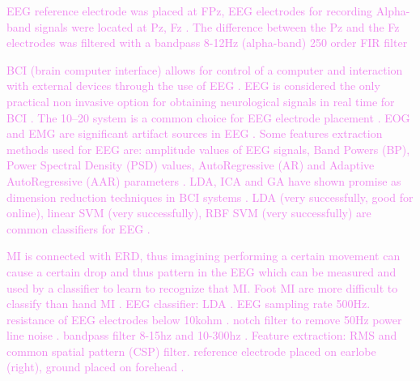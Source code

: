 \textcolor{violet}{EEG reference electrode was placed at FPz, EEG electrodes for recording Alpha-band signals were located at Pz, Fz \cite{minatiHybridControlVisionGuided2016}. The difference between the Pz and the Fz electrodes was filtered with a bandpass 8-12Hz (alpha-band) 250 order FIR filter \cite{minatiHybridControlVisionGuided2016}    }

\textcolor{violet}{BCI (brain computer interface) allows for control of a computer and interaction with external devices through the use of EEG \cite{fouadBrainComputerInterface2015}. EEG is considered the only practical non invasive option for obtaining neurological signals in real time for BCI \cite{fouadBrainComputerInterface2015}. The 10–20 system is a common choice for EEG electrode placement \cite{fouadBrainComputerInterface2015}. EOG and EMG are significant artifact sources in EEG \cite{fouadBrainComputerInterface2015}\cite{islamSignalArtifactsTechniques2021}. Some features extraction methods used for EEG are: amplitude values of EEG signals, Band Powers (BP), Power Spectral Density (PSD) values, AutoRegressive (AR) and Adaptive AutoRegressive (AAR) parameters \cite{fouadBrainComputerInterface2015}. LDA, ICA and GA have shown promise as dimension reduction techniques in BCI systems \cite{fouadBrainComputerInterface2015}. LDA (very successfully, good for online), linear SVM (very successfully), RBF SVM (very successfully) are common classifiers for EEG \cite{fouadBrainComputerInterface2015}.       }

\textcolor{violet}{MI is connected with ERD\cite{gordleevaRealTimeEEGEMG2020}, thus imagining performing a certain movement can cause a certain drop and thus pattern in the EEG which can be measured and used by a classifier to learn to recognize that MI. Foot MI are more difficult to classify than hand MI \cite{gordleevaRealTimeEEGEMG2020}. EEG classifier: LDA \cite{gordleevaRealTimeEEGEMG2020}. EEG sampling rate 500Hz\cite{gordleevaRealTimeEEGEMG2020}. resistance of EEG electrodes below 10kohm \cite{gordleevaRealTimeEEGEMG2020}. notch filter to remove 50Hz power line noise \cite{gordleevaRealTimeEEGEMG2020}. bandpass filter 8-15hz and 10-300hz \cite{gordleevaRealTimeEEGEMG2020}. Feature extraction: RMS and common spatial pattern (CSP) filter\cite{gordleevaRealTimeEEGEMG2020}. reference electrode placed on earlobe (right), ground placed on forehead \cite{gordleevaRealTimeEEGEMG2020}.   }

